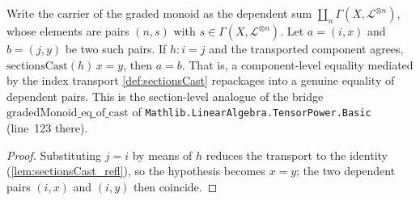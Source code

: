 \begin{lemma}
  \label{lem:gradedMonoid_eq_of_cast}
  Write the carrier of the graded monoid as the dependent sum
  \(\coprod_{n} \Gamma(X, \mathcal{L}^{\otimes n})\), whose elements are pairs
  \((n, s)\) with \(s \in \Gamma(X, \mathcal{L}^{\otimes n})\). Let
  \(a = (i, x)\) and \(b = (j, y)\) be two such pairs. If \(h : i = j\) and the
  transported component agrees, \(\mathrm{sectionsCast}(h)\,x = y\), then
  \(a = b\). That is, a component-level equality mediated by the index transport
  \cref{def:sectionsCast} repackages into a genuine equality of dependent pairs.
  This is the section-level analogue of the bridge
  \(\mathrm{gradedMonoid\_eq\_of\_cast}\) of
  \texttt{Mathlib.LinearAlgebra.TensorPower.Basic} (line~123 there).
\end{lemma}

\begin{proof}
  Substituting \(j = i\) by means of \(h\) reduces the transport to the identity
  (\cref{lem:sectionsCast_refl}), so the hypothesis becomes \(x = y\); the two
  dependent pairs \((i, x)\) and \((i, y)\) then coincide.
\end{proof}

